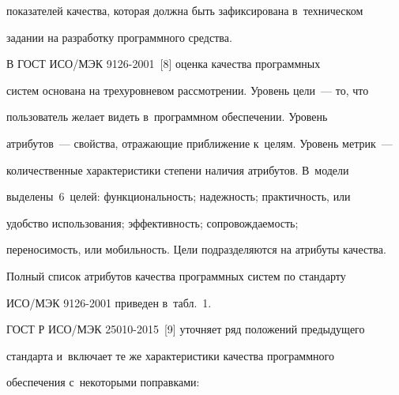 показателей качества, которая должна быть зафиксирована в~техническом 

задании на разработку программного средства.

     

     В ГОСТ ИСО\!/\!МЭК 9126-2001~[8] оценка качества программных 

систем основана на трехуровневом рассмотрении. Уровень цели~--- то, что 

пользователь желает видеть в~программном обеспечении. Уровень  

атрибутов~--- свойства, отражающие при\-бли\-же\-ние к~целям. Уровень метрик~--- 

количественные характеристики степени наличия атрибутов. В~модели 

выделены~6~целей: функциональность; надежность; прак\-тич\-ность, или 

 удоб\-ст\-во использования; эф\-фек\-тив\-ность; со\-про\-вож\-да\-емость; 

пе\-ре\-но\-си\-мость, или мо\-биль\-ность. Цели подразделяются на атрибуты качества.

     

     Полный список атрибутов качества программных сис\-тем по стандарту 

ИСО\!/\!МЭК 9126-2001 приведен в~табл.~1.

     

     



     

     ГОСТ Р ИСО/МЭК 25010-2015~[9] уточняет ряд положений предыдущего 

стандарта и~включает те же характеристики качества программного 

обеспечения с~некоторыми поправками:

